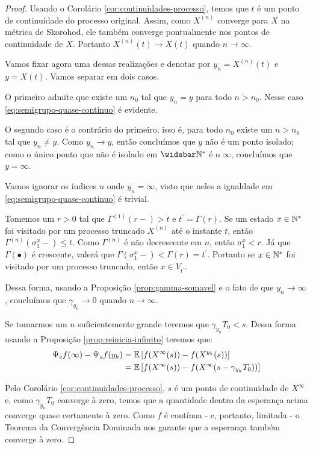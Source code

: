 \begin{proof}
  Usando o Corolário \ref{cor:continuidades-processo}, temos que $t$ é
  \qc um ponto de continuidade do processo original. Assim, como
  $X^{(n)}$ converge \qc para $X$ na métrica de Skorohod, ele também
  converge pontualmente nos pontos de continuidade de $X$. Portanto
  $X^{(n)}(t) \to X(t)$ \qc quando $n \to \infty$.

  Vamos fixar agora uma dessas realizações e denotar por $y_n =
  X^{(n)}(t)$ e $y = X(t)$. Vamos separar em dois casos.

  O primeiro admite que existe um $n_0$ tal que $y_n = y$ para todo $n >
  n_0$. Nesse caso \eqref{eq:semigrupo-quase-continuo} é evidente.

  O segundo caso é o contrário do primeiro, isso é, para todo $n_0$
  existe um $n > n_0$ tal que $y_n \neq y$. Como $y_n \to y$, então
  concluímos que $y$ não é um ponto isolado; como o único ponto que
  não é isolado em $\Nzb$ é o $\infty$, concluímos que $y = \infty$.

  Vamos ignorar os índices $n$ onde $y_n = \infty$, visto que neles a
  igualdade em \eqref{eq:semigrupo-quase-continuo} é trivial. 

  Tomemos um $r > 0$ tal que $\Gamma^{(1)}(r-) > t$ e $t^\prime =
  \Gamma(r)$. Se um estado $x\in {\mathbb{N^*}}$ foi visitado por um processo
  truncado $X^{(n)}$ até o instante $t$, então
  $\Gamma^{(n)}(\sigma_1^x-) \leq t$. Como $\Gamma^{(n)}$ é não
  decrescente em $n$, então $\sigma_1^x < r$. Já que $\Gamma(\bullet)$
  é crescente, valerá que $\Gamma(\sigma_1^x-) < \Gamma(r) =
  t^\prime$. Portanto se $x \in {\mathbb{N^*}}$ foi visitado por um processo
  truncado, então $x \in V_{t^\prime}$.

  Dessa forma, usando a Proposição \ref{prop:gamma-somavel} e o fato
  de que $y_n \to \infty$, concluímos que $\gamma_{y_n} \to 0$ quando
  $n \to \infty$.

  Se tomarmos um $n$ suficientemente grande teremos que $\gamma_{y_n}
  T_0 < s$. Dessa forma usando a Proposição
  \ref{prop:reinicia-infinito} teremos que:
  \begin{align*}
    \Psi_s f (\infty) - \Psi_s f (y_k) &=
    {\mathbb{E}}\left[ f(X^\infty(s)) - f(X^{y_k}(s)) \right] \\
    &= {\mathbb{E}}\left[ f(X^\infty(s)) -f (X^\infty(s - \gamma_{y_k}T_0)) \right] \\
  \end{align*}

  Pelo Corolário \ref{cor:continuidades-processo}, $s$ é \qc um ponto
  de continuidade de $X^\infty$ e, como $\gamma_{y_n} T_0$ converge à
  zero, temos que a quantidade dentro da esperança acima converge
  quase certamente à zero. Como $f$ é contínua - e, portanto, limitada
  - o Teorema da Convergência Dominada nos garante que a esperança
  também converge à zero.
\end{proof}


